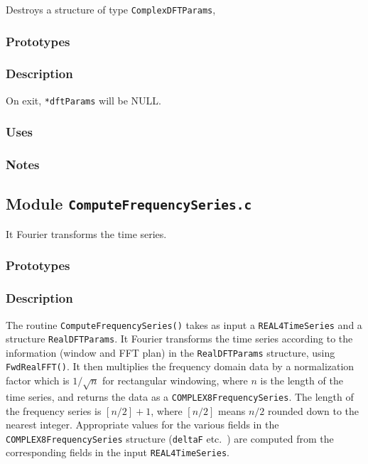 Destroys a structure of type \verb+ComplexDFTParams+,

\subsubsection*{Prototypes}
\vspace{0.1in}


\subsubsection*{Description}

On exit, \verb+*dftParams+ will be NULL.

\subsubsection*{Uses}

\subsubsection*{Notes}

\vfill{\footnotesize}

\newpage
\subsection{Module \texttt{ComputeFrequencySeries.c}}
\label{ss:ComputeFrequencySeries.c}

It Fourier transforms the time series.

\subsubsection*{Prototypes}
\vspace{0.1in}


\subsubsection*{Description}

The routine \verb+ComputeFrequencySeries()+ takes as input a
\verb+REAL4TimeSeries+ and a structure \verb+RealDFTParams+.  It Fourier
transforms the time series according to the information (window and FFT plan)
in the \verb+RealDFTParams+ structure, using \verb+FwdRealFFT()+.  It then
multiplies the frequency domain data by a normalization factor which is
$1/\sqrt{n}$ for rectangular windowing, where $n$ is the length of the time
series, and returns the data as a \verb+COMPLEX8FrequencySeries+.  The length
of the frequency series is $[n/2]+1$, where $[n/2]$ means $n/2$ rounded down
to the nearest integer.  Appropriate values for the various fields in the
\verb+COMPLEX8FrequencySeries+ structure (\verb+deltaF+ etc.~) are computed
from the corresponding fields in the input \verb+REAL4TimeSeries+. 

